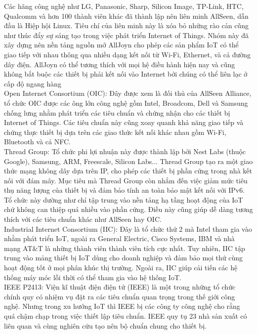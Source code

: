 \begin{itemize}
Các hãng công nghệ như LG, Panasonic, Sharp, Silicon Image, TP-Link, HTC, Qualcomm và hơn 100 thành viên khác đã thành lập nên liên minh AllSeen, dẫn đầu là Hiệp hội Linux. Tiêu chí của liên minh này là xóa bỏ những rào cản cũng như thúc đẩy sự sáng tạo trong việc phát triển Internet of Things. Nhóm này đã xây dựng nên nền tảng nguồn mở AllJoyn cho phép các sản phẩm IoT có thể giao tiếp với nhau thông qua nhiều dạng kết nối từ Wi-Fi, Ethernet, và cả đường dây điện. AllJoyn có thể tương thích với mọi hệ điều hành hiện nay và cũng không bắt buộc các thiết bị phải kết nối vào Internet bởi chúng có thể liên lạc ở cấp độ ngang hàng\\

Open Internet Consortium (OIC): Đây được xem là đối thủ của AllSeen Alliance, tổ chức OIC được các ông lớn công nghệ gồm Intel, Broadcom, Dell và Samsung chống lưng nhằm phát triển các tiêu chuẩn và chứng nhận cho các thiết bị Internet of Things. Các tiêu chuẩn này cũng xoay quanh khả năng giao tiếp và chứng thực thiết bị dựa trên các giao thức kết nối khác nhau gồm Wi-Fi, Bluetooth và cả NFC.\\

Thread Group: Tổ chức phi lợi nhuận này được thành lập bởi Nest Labs (thuộc Google), Samsung, ARM, Freescale, Silicon Labs... Thread Group tạo ra một giao thức mạng không dây dựa trên IP, cho phép các thiết bị phần cứng trong nhà kết nối với đám mây. Mục tiêu mà Thread Group còn nhắm đến việc giảm mức tiêu thụ năng lượng của thiết bị và đảm bảo tính an toàn bảo mật kết nối với IPv6. Tổ chức này dường như chỉ tập trung vào nền tảng hạ tầng hoạt động của IoT chứ không can thiệp quá nhiều vào phần cứng. Điều này cũng giúp dễ dàng tương thích với các tiêu chuẩn khác như AllSeen hay OIC.\\

Industrial Internet Consortium (IIC): Đây là tổ chức thứ 2 mà Intel tham gia vào nhằm phát triển IoT, ngoài ra General Electric, Cisco Systems, IBM và nhà mạng AT\&T là những thành viên thành viên tích cực nhất. Tuy nhiên, IIC tập trung vào mảng thiết bị IoT dùng cho doanh nghiệp và đảm bảo mọi thứ cùng hoạt động tốt ở mọi phân khúc thị trường. Ngoài ra, IIC giúp cải tiến các hệ thống máy móc lỗi thời có thể tham gia vào hệ thống IoT.\\

IEEE P2413: Viện kĩ thuật điện điện tử (IEEE) là một trong những tổ chức chính quy có nhiệm vụ đặt ra các tiêu chuẩn quan trọng trong thế giới công nghệ. Nhưng trong xu hướng IoT thì IEEE bị các công ty công nghệ cho rằng quá chậm chạp trong việc thiết lập tiêu chuẩn. IEEE quy tụ 23 nhà sản xuất có liên quan và cùng nghiên cứu tạo nên bộ chuẩn chung cho thiết bị.\\


\end{itemize}
